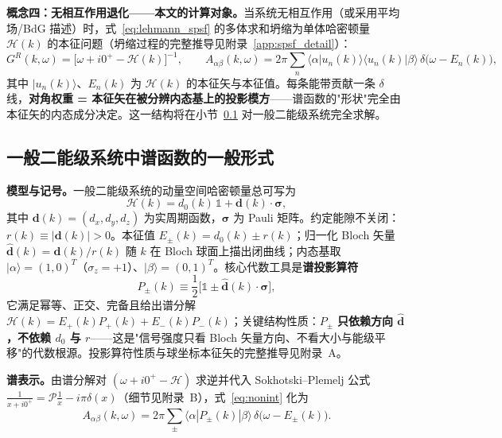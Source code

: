 \documentclass[onecolumn,aps,prl,superscriptaddress,longbibliography]{revtex4-2}
\begin{document}
\textbf{概念四：无相互作用退化——本文的计算对象。}当系统无相互作用（或采用平均场/BdG 描述）时，式~\eqref{eq:lehmann_spsf} 的多体求和坍缩为单体哈密顿量 $\mathcal{H}(k)$ 的本征问题（坍缩过程的完整推导见附录~\ref{app:spsf_detail}）：
\begin{equation}\label{eq:nonint}
G^R(k,\omega) = \big[\omega + i0^+ - \mathcal{H}(k)\big]^{-1},
\qquad
A_{\alpha\beta}(k,\omega) = 2\pi\sum_n \langle\alpha|u_n(k)\rangle\langle u_n(k)|\beta\rangle\,\delta\big(\omega - E_n(k)\big),
\end{equation}
其中 $|u_n(k)\rangle$、$E_n(k)$ 为 $\mathcal{H}(k)$ 的本征矢与本征值。每条能带贡献一条 $\delta$ 线，\textbf{对角权重 = 本征矢在被分辨内态基上的投影模方}——谱函数的"形状"完全由本征矢的内态成分决定。这一结构将在小节~\ref{sec:spsf_form} 对一般二能级系统完全求解。

\subsection{一般二能级系统中谱函数的一般形式}\label{sec:spsf_form}

\textbf{模型与记号。}一般二能级系统的动量空间哈密顿量总可写为
\begin{equation}\label{eq:H2level}
\mathcal{H}(k) = d_0(k)\,\mathbb{1} + \mathbf{d}(k)\cdot\symbf{\sigma},
\end{equation}
其中 $\mathbf{d}(k) = (d_x,d_y,d_z)$ 为实周期函数，$\symbf{\sigma}$ 为 Pauli 矩阵。约定能隙不关闭：$r(k) \equiv |\mathbf{d}(k)| > 0$。本征值 $E_\pm(k) = d_0(k) \pm r(k)$；归一化 Bloch 矢量 $\hat{\mathbf{d}}(k) = \mathbf{d}(k)/r(k)$ 随 $k$ 在 Bloch 球面上描出闭曲线；内态基取 $|\alpha\rangle = (1,0)^T$（$\sigma_z = +1$）、$|\beta\rangle = (0,1)^T$。核心代数工具是\textbf{谱投影算符}
\begin{equation}\label{eq:projector}
P_\pm(k) \equiv \frac{1}{2}\Big[\mathbb{1} \pm \hat{\mathbf{d}}(k)\cdot\symbf{\sigma}\Big],
\end{equation}
它满足幂等、正交、完备且给出谱分解 $\mathcal{H}(k) = E_+(k)P_+(k) + E_-(k)P_-(k)$；关键结构性质：$P_\pm$ \textbf{只依赖方向 $\hat{\mathbf{d}}$，不依赖 $d_0$ 与 $r$}——这是"信号强度只看 Bloch 矢量方向、不看大小与能级平移"的代数根源。投影算符性质与球坐标本征矢的完整推导见附录~A。

\textbf{谱表示。}由谱分解对 $(\omega + i0^+ - \mathcal{H})$ 求逆并代入 Sokhotski--Plemelj 公式 $\frac{1}{x+i0^+} = \mathcal{P}\frac{1}{x} - i\pi\delta(x)$（细节见附录~B），式~\eqref{eq:nonint} 化为
\begin{equation}\label{eq:spsf_repr}
A_{\alpha\beta}(k,\omega) = 2\pi\sum_{\pm}\langle\alpha|P_\pm(k)|\beta\rangle\,\delta\big(\omega - E_\pm(k)\big).
\end{equation}
\end{document}
